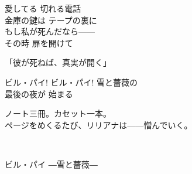 \begin{lyrics}
\begin{japanese}
愛してる 切れる電話\\
金庫の鍵は テープの裏に\\
もし私が死んだなら——\\
その時 扉を開けて
\end{japanese}

\begin{japanese}
「彼が死ねば、真実が開く」
\end{japanese}

\begin{japanese}
ビル・パイ! ビル・パイ! 雪と薔薇の\\
最後の夜が 始まる
\end{japanese}

\begin{japanese}
ノート三冊。カセット一本。\\
ページをめくるたび、リリアナは——憎んでいく。
\end{japanese}

\\
\begin{japanese}
ビル・パイ ―雪と薔薇―
\end{japanese}
\end{lyrics}

